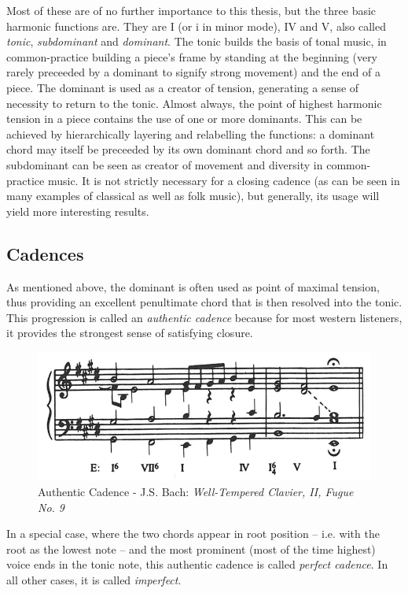 \documentclass[a4paper,12pt]{report}
\begin{document}
Most of these are of no further importance to this thesis, but the three basic harmonic functions are. They are I (or i in minor mode), IV and V, also called \textit{tonic}, \textit{subdominant} and \textit{dominant}. The tonic builds the basis of tonal music, in common-practice building a piece's frame by standing at the beginning (very rarely preceeded by a dominant to signify strong movement) and the end of a piece. The dominant is used as a creator of tension, generating a sense of necessity to return to the tonic. Almost always, the point of highest harmonic tension in a piece contains the use of one or more dominants. This can be achieved by hierarchically layering and relabelling the functions: a dominant chord may itself be preceeded by its own dominant chord and so forth. The subdominant can be seen as creator of movement and diversity in common-practice music. It is not strictly necessary for a closing cadence (as can be seen in many examples of classical as well as folk music), but generally, its usage will yield more interesting results.

\subsection{Cadences}
As mentioned above, the dominant is often used as point of maximal tension, thus providing an excellent penultimate chord that is then resolved into the tonic. This progression is called an \textit{authentic cadence} because for most western listeners, it provides the strongest sense of satisfying closure.
\begin{figure}[h]
\centering
\includegraphics[scale=0.4]{Piston_7.jpg}
\caption{Authentic Cadence - J.S. Bach: \textit{Well-Tempered Clavier, II, Fugue No. 9}}
\end{figure}

In a special case, where the two chords appear in root position -- i.e. with the root as the lowest note -- and the most prominent (most of the time highest) voice ends in the tonic note, this authentic cadence is called \textit{perfect cadence}. In all other cases, it is called \textit{imperfect}.
\end{document}
